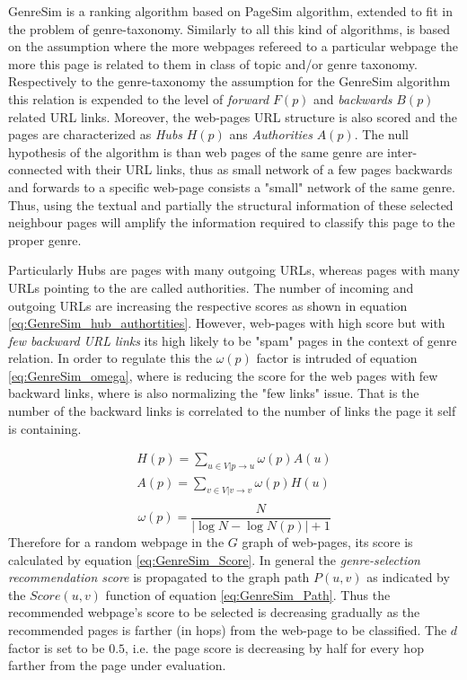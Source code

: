 GenreSim is a ranking algorithm based on PageSim algorithm, extended to fit in the problem of genre-taxonomy. Similarly to all this kind of algorithms, is based on the assumption where the more webpages refereed to a particular webpage the more this page is related to them in class of topic and/or genre taxonomy. Respectively to the genre-taxonomy the assumption for the GenreSim algorithm this relation is expended to the level of \textit{forward} $F(p)$ and \textit{backwards} $B(p)$ related URL links. Moreover, the web-pages URL structure is also scored and the pages are characterized as \textit{Hubs} $H(p)$ ans \textit{Authorities} $A(p)$. The null hypothesis of the algorithm is than web pages of the same genre are inter-connected with their URL links, thus as small network of a few pages backwards and forwards to a specific web-page consists a "small" network of the same genre. Thus, using the textual and partially the structural information of these selected neighbour pages will amplify the information required to classify this page to the proper genre.

Particularly Hubs are pages with many outgoing URLs, whereas pages with many URLs pointing to the are called authorities. The number of incoming and outgoing URLs are increasing the respective scores as shown in equation \ref{eq:GenreSim_hub_authortities}. However, web-pages with high score but with \textit{few backward URL links} its high likely to be "spam" pages in the context of genre relation. In order to regulate this the $\omega(p)$ factor is intruded of equation \ref{eq:GenreSim_omega}, where is reducing the score for the web pages with few backward links, where is also normalizing the "few links" issue. That is the number of the backward links is correlated to the number of links the page it self is containing. 

\begin{equation}\label{eq:GenreSim_hub_authortities}
	\begin{array}{l}
		H(p) = \sum_{u \in V|p \to u} \omega(p) A(u) \\  
    	A(p) = \sum_{v \in V|v \to v} \omega(p) H(u) \\
    \end{array}
\end{equation}
\begin{equation}\label{eq:GenreSim_omega}
	\omega(p) = \frac{N}{|\log N - \log N(p) | + 1} 
\end{equation}
Therefore for a random webpage in the $G$ graph of web-pages, its score is calculated by equation \ref{eq:GenreSim_Score}. In general the \textit{genre-selection recommendation score} is propagated to the graph path $P(u,v)$ as indicated by the $Score(u, v)$ function of equation \ref{eq:GenreSim_Path}. Thus the recommended webpage's score to be selected is decreasing gradually as the recommended pages is farther (in hops) from the web-page to be classified. The $d$ factor is set to be $0.5$, i.e. the page score is decreasing by half for every hop farther from the page under evaluation. 

